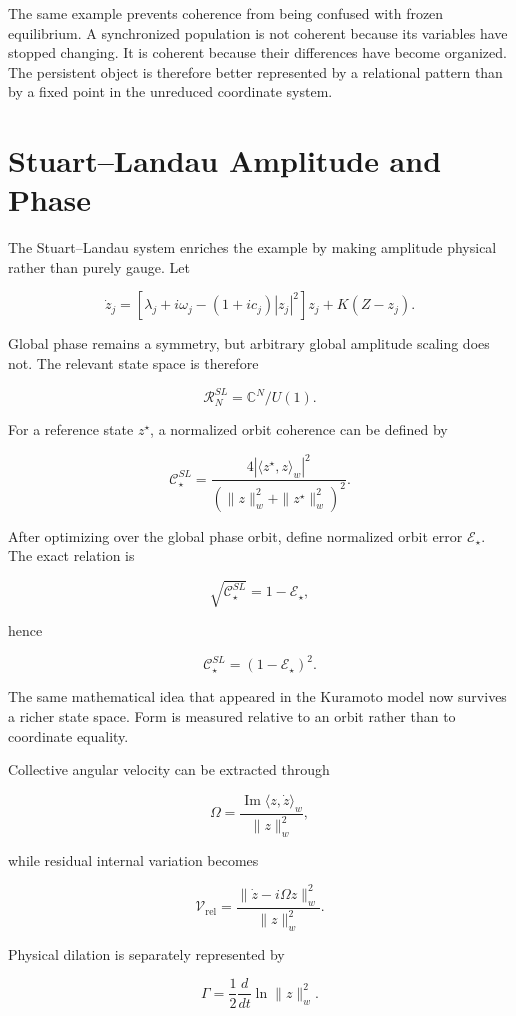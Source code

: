 The same example prevents coherence from being confused with frozen equilibrium. A synchronized population is not coherent because its variables have stopped changing. It is coherent because their differences have become organized. The persistent object is therefore better represented by a relational pattern than by a fixed point in the unreduced coordinate system.

\section{Stuart--Landau Amplitude and Phase}

The Stuart--Landau system enriches the example by making amplitude physical rather than purely gauge. Let

\[
\dot z_j=\left[\lambda_j+i\omega_j-(1+ic_j)|z_j|^2\right]z_j+K(Z-z_j).
\]

Global phase remains a symmetry, but arbitrary global amplitude scaling does not. The relevant state space is therefore

\[
\mathscr R_N^{SL}=\mathbb C^N/U(1).
\]

For a reference state $z^\star$, a normalized orbit coherence can be defined by

\[
\mathscr C_\star^{SL}=\frac{4|\langle z^\star,z\rangle_w|^2}{(\|z\|_w^2+\|z^\star\|_w^2)^2}.
\]

After optimizing over the global phase orbit, define normalized orbit error $\mathcal E_\star$. The exact relation is

\[
\sqrt{\mathscr C_\star^{SL}}=1-\mathcal E_\star,
\]

hence

\[
\mathscr C_\star^{SL}=(1-\mathcal E_\star)^2.
\]

The same mathematical idea that appeared in the Kuramoto model now survives a richer state space. Form is measured relative to an orbit rather than to coordinate equality.

Collective angular velocity can be extracted through

\[
\Omega=\frac{\operatorname{Im}\langle z,\dot z\rangle_w}{\|z\|_w^2},
\]

while residual internal variation becomes

\[
\mathscr V_{\mathrm{rel}}=\frac{\|\dot z-i\Omega z\|_w^2}{\|z\|_w^2}.
\]

Physical dilation is separately represented by

\[
\Gamma=\frac12\frac{d}{dt}\ln\|z\|_w^2.
\]

